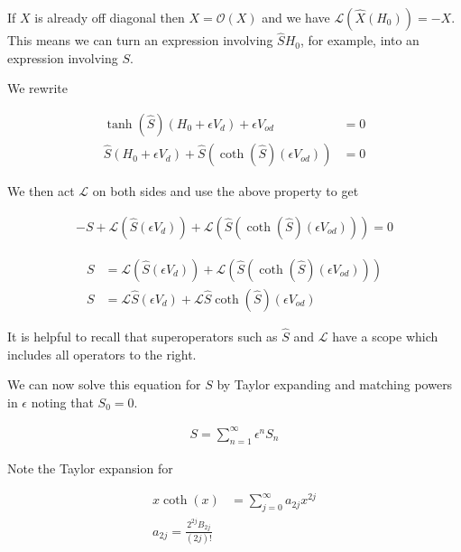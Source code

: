 \documentclass[12pt]{article}
\begin{document}
If $X$ is already off diagonal then $X=\mathcal{O}(X)$ and we have $\mathcal{L}(\hat{X}(H_0)) = -X$. This means we can turn an expression involving $\hat{S}H_0$, for example, into an expression involving $S$.

We rewrite

\begin{equation}
\begin{split}
\tanh(\hat{S})(H_0 + \epsilon V_d) + \epsilon V_{od} &= 0\\
\hat{S}(H_0 + \epsilon V_d) + \hat{S}(\coth(\hat{S})(\epsilon V_{od})) &=0
\end{split}
\end{equation}

We then act $\mathcal{L}$ on both sides and use the above property to get

\begin{equation}
\begin{split}
-S + \mathcal{L}(\hat{S}(\epsilon V_d)) + \mathcal{L}(\hat{S}(\coth(\hat{S})(\epsilon V_{od}))) = 0
\end{split}
\end{equation}

\begin{equation}
\begin{split}
S &= \mathcal{L}(\hat{S}(\epsilon V_d)) + \mathcal{L}(\hat{S}(\coth(\hat{S})(\epsilon V_{od})))\\
S &= \mathcal{L}\hat{S}(\epsilon V_d) + \mathcal{L}\hat{S}\coth(\hat{S})(\epsilon V_{od})
\end{split}
\end{equation}

It is helpful to recall that superoperators such as $\hat{S}$ and $\mathcal{L}$ have a scope which includes all operators to the right.

We can now solve this equation for $S$ by Taylor expanding and matching powers in $\epsilon$ noting that $S_0=0$.

\begin{align}
S = \sum_{n=1}^{\infty} \epsilon^n S_n
\end{align}

Note the Taylor expansion for

\begin{equation}
\begin{split}
x \coth(x) &= \sum_{j=0}^{\infty} a_{2j} x^{2j}\\
a_{2j} = \frac{2^{2j} B_{2j}}{(2j)!}
\end{split}
\end{equation}
\end{document}
